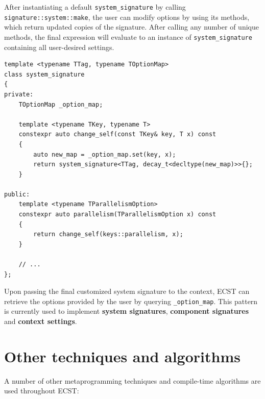\documentclass[twoside, 12pt, a4paper, openany]{book}
\begin{document}
After instantiating a default
\texttt{system_signature}
by calling
\texttt{signature::system::make},
the user can modify options by using its methods, which return updated
copies of the signature. After calling any number of unique methods, the
final expression will evaluate to an instance of
\texttt{system_signature}
containing all user-desired settings.

\begin{verbatim}
template <typename TTag, typename TOptionMap>
class system_signature
{
private:
    TOptionMap _option_map;

    template <typename TKey, typename T>
    constexpr auto change_self(const TKey& key, T x) const
    {
        auto new_map = _option_map.set(key, x);
        return system_signature<TTag, decay_t<decltype(new_map)>>{};
    }

public:
    template <typename TParallelismOption>
    constexpr auto parallelism(TParallelismOption x) const
    {
        return change_self(keys::parallelism, x);
    }

    // ...
};
\end{verbatim}

Upon passing the final customized system signature to the context, ECST
can retrieve the options provided by the user by querying
\texttt{_option_map}.
This pattern is currently used to implement \textbf{system signatures},
\textbf{component signatures} and \textbf{context settings}.

\section{Other techniques and
algorithms}\label{other-techniques-and-algorithms}

A number of other metaprogramming techniques and compile-time algorithms
are used throughout ECST:
\end{document}
